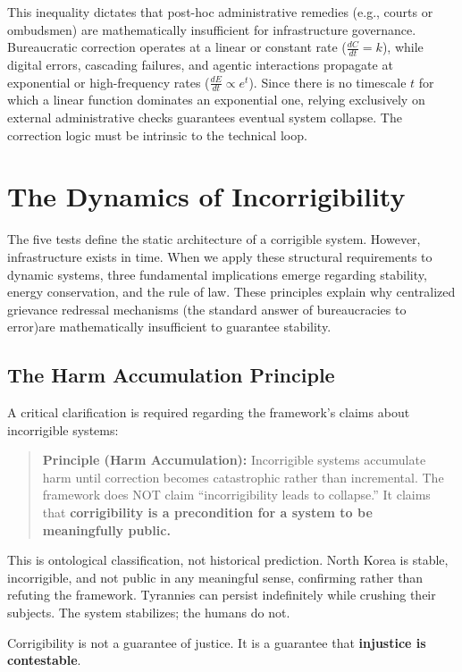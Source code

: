 \documentclass{article}
\begin{document}
This inequality dictates that post-hoc administrative remedies (e.g., courts or ombudsmen) are mathematically insufficient for infrastructure governance. Bureaucratic correction operates at a linear or constant rate ($\frac{dC}{dt} = k$), while digital errors, cascading failures, and agentic interactions propagate at exponential or high-frequency rates ($\frac{dE}{dt} \propto e^{t}$). Since there is no timescale $t$ for which a linear function dominates an exponential one, relying exclusively on external administrative checks guarantees eventual system collapse. The correction logic must be intrinsic to the technical loop.

\section{The Dynamics of Incorrigibility}
\label{sec:dynamics}

The five tests define the static architecture of a corrigible system. However, infrastructure exists in time. When we apply these structural requirements to dynamic systems, three fundamental implications emerge regarding stability, energy conservation, and the rule of law. These principles explain why centralized grievance redressal mechanisms (the standard answer of bureaucracies to error)are mathematically insufficient to guarantee stability.

\subsection{The Harm Accumulation Principle}

A critical clarification is required regarding the framework's claims about incorrigible systems:

\begin{quote}
\textbf{Principle (Harm Accumulation):} Incorrigible systems accumulate harm until correction becomes catastrophic rather than incremental. The framework does NOT claim ``incorrigibility leads to collapse.'' It claims that \textbf{corrigibility is a precondition for a system to be meaningfully public.}
\end{quote}

This is ontological classification, not historical prediction. North Korea is stable, incorrigible, and not public in any meaningful sense, confirming rather than refuting the framework. Tyrannies can persist indefinitely while crushing their subjects. The system stabilizes; the humans do not.

\begin{clarification}[title=The Core Claim]
Corrigibility is not a guarantee of justice. It is a guarantee that \textbf{injustice is contestable}.
\end{clarification}
\end{document}
